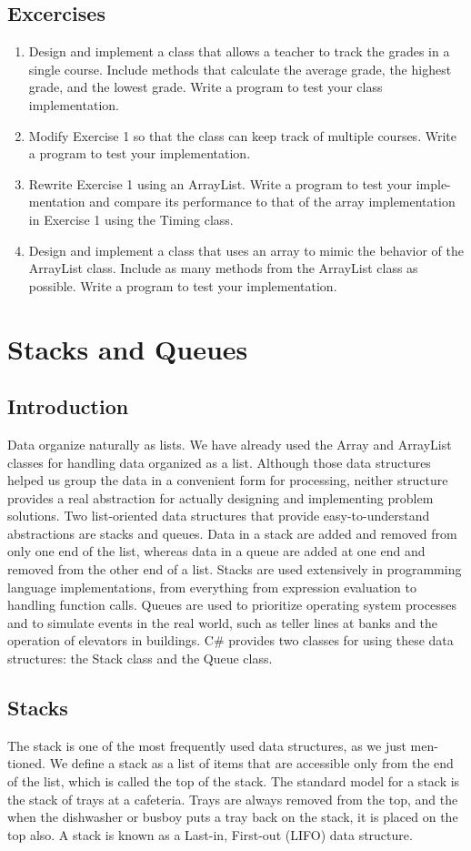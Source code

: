 \documentclass[12pt,a4paper,final,twoside,titlepage]{book}
\begin{document}
\section{Excercises}
\begin{enumerate}
\item Design and implement a class that allows a teacher to track the grades in a single course. Include methods that calculate the average grade, the highest grade, and the lowest grade. Write a program to test your class implementation.
\item Modify Exercise 1 so that the class can keep track of multiple courses. Write a program to test your implementation.
\item Rewrite Exercise 1 using an ArrayList. Write a program to test your imple- mentation and compare its performance to that of the array implementation in Exercise 1 using the Timing class.
\item Design and implement a class that uses an array to mimic the behavior of the ArrayList class. Include as many methods from the ArrayList class as possible. Write a program to test your implementation.
\end{enumerate}
\chapter{Stacks and Queues}
\section{Introduction}
Data organize naturally as lists. We have already used the Array and ArrayList classes for handling data organized as a list. Although those data structures helped us group the data in a convenient form for processing, neither structure provides a real abstraction for actually designing and implementing problem solutions.
Two list-oriented data structures that provide easy-to-understand abstractions are stacks and queues. Data in a stack are added and removed from only one end of the list, whereas data in a queue are added at one end and removed from the other end of a list. Stacks are used extensively in programming language implementations, from everything from expression evaluation to handling function calls. Queues are used to prioritize operating system processes and to simulate events in the real world, such as teller lines at banks and the operation of elevators in buildings.
C\# provides two classes for using these data structures: the Stack class and the Queue class.
\section{Stacks}
The stack is one of the most frequently used data structures, as we just men- tioned. We define a stack as a list of items that are accessible only from the end of the list, which is called the top of the stack. The standard model for a stack is the stack of trays at a cafeteria. Trays are always removed from the top, and the when the dishwasher or busboy puts a tray back on the stack, it is placed on the top also. A stack is known as a Last-in, First-out (LIFO) data structure.
\end{document}
